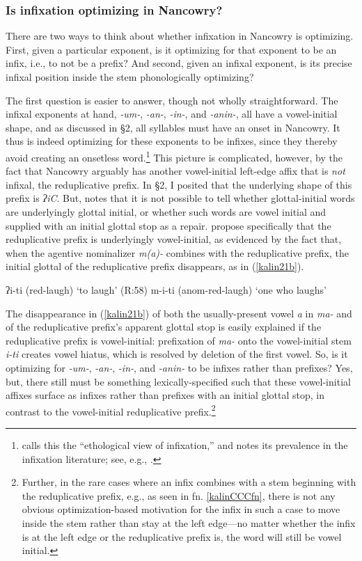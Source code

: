 \documentclass[output=paper,colorlinks,citecolor=brown,
]{langscibook}
\begin{document}
\subsubsection{Is infixation optimizing in Nancowry?}\label{kalinoptinf}

There are two ways to think about whether infixation in Nancowry is optimizing. First, given a particular exponent, is it optimizing for that exponent to be an infix, i.e., to not be a prefix? And second, given an infixal exponent, is its precise infixal position inside the stem phonologically optimizing?

The first question is easier to answer, though not wholly straightforward. The infixal exponents at hand, \textit{-um-}, \textit{-an-}, \textit{-in-}, and \textit{-anin-}, all have a vowel-initial shape, and as discussed in \S2, all syllables must have an onset in Nancowry. It thus is indeed optimizing for these exponents to be infixes, since they thereby avoid creating an onsetless word.\footnote{\citet[\S2.5.1]{Yu07} calls this the ``ethological view of infixation,'' and notes its prevalence in the infixation literature; see, e.g., \citealt{Anderson72,Cohn92,Buckley97}.} This picture is complicated, however, by the fact that Nancowry arguably has another vowel-initial left-edge affix that is {\it not} infixal, the reduplicative prefix. In \S2, I posited that the underlying shape of this prefix is \textit{ʔiC}. But, \citet[35]{Rad81} notes that it is not possible to tell whether glottal-initial words are underlyingly glottal initial, or whether such words are vowel initial and supplied with an initial glottal stop as a repair. \citet[348]{Alderete99} propose specifically that the reduplicative prefix is underlyingly vowel-initial, as evidenced by the fact that, when the agentive nominalizer \textit{m(a)-} combines with the reduplicative prefix, the initial glottal of the reduplicative prefix disappears, as in (\ref{kalin21b}).

\ea \ea ʔi-ti ({\sc red-}laugh) \hfill `to laugh' (R:58)
\ex m-i-ti ({\sc anom-red-}laugh) \hfill `one who laughs'\label{kalin21b}
\z
\z

\noindent The disappearance in (\ref{kalin21b}) of both the usually-present vowel \textit{a} in \textit{ma-} and of the reduplicative prefix's apparent glottal stop is easily explained if the reduplicative prefix is vowel-initial: prefixation of \textit{ma-} onto the vowel-initial stem \textit{i-ti} creates vowel hiatus, which is resolved by deletion of the first vowel. So, is it optimizing for \textit{-um-}, \textit{-an-}, \textit{-in-}, and \textit{-anin-} to be infixes rather than prefixes? Yes, but, there still must be something lexically-specified such that these vowel-initial affixes surface as infixes rather than prefixes with an initial glottal stop, in contrast to the vowel-initial reduplicative prefix.\footnote{Further, in the rare cases where an infix combines with a stem beginning with the reduplicative prefix, e.g., as seen in fn. \ref{kalinCCCfn}, there is not any obvious optimization-based motivation for the infix in such a case to move inside the stem rather than stay at the left edge---no matter whether the infix is at the left edge or the reduplicative prefix is, the word will still be vowel initial.}
\end{document}
